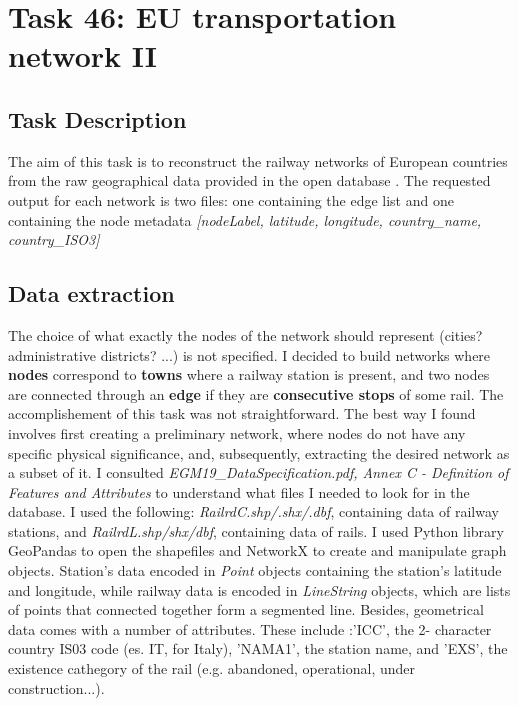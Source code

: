 \chapter{Task 46: EU transportation network II}
\section{Task Description}
The aim of this task is to reconstruct the railway networks of European countries from the raw geographical data provided in the open database
\parencite[][ \textit{EuroGlobalMap}, $2019$ release]{euroglobalmap}. The requested output for each network is two files: one containing the edge list and one containing the node metadata \textit{[nodeLabel, latitude, longitude, country\_name, country\_ISO3]}
\section{Data extraction}
The choice of what exactly the nodes of the network should represent (cities? administrative districts? ...) is not specified. 
I decided to build networks where \textbf{nodes} correspond to \textbf{towns} where a railway station is present, and two nodes are connected through an \textbf{edge}  if they are \textbf{consecutive stops} of some rail. The accomplishement of this task was not straightforward. The best way I found involves first creating a preliminary network, where nodes do not have any specific physical significance, and, subsequently, extracting the desired network as a subset of it. \newline \noindent
I consulted \textit{EGM19\_DataSpecification.pdf, 
 Annex C - Definition of Features and Attributes} to understand what files I needed to look for in the database. I used the following:
 \textit{RailrdC.shp/.shx/.dbf}, containing data of railway stations, and \textit{RailrdL.shp/shx/dbf}, containing data of rails. I used Python library GeoPandas to open the shapefiles and NetworkX to create and manipulate graph objects. Station's data encoded in \textit{Point} objects containing the station's latitude and longitude, while railway data is encoded in \textit{LineString} objects, which are lists of points that connected together form a segmented line.
Besides, geometrical data comes with a number of attributes. These include :'ICC', the 2- character country IS03 code (es. IT, for Italy),  'NAMA1', the station name, and 'EXS', the existence cathegory of the rail (e.g. abandoned, operational, under construction...).
\medskip \newline \noindent

